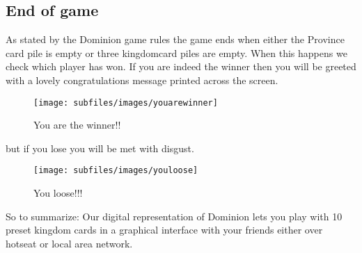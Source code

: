\subsection{End of game}
As stated by the Dominion game rules the game ends when either the Province card pile is empty or three kingdomcard piles are empty. When this happens we check which player has won. If you are indeed the winner then you will be greeted with a lovely congratulations message printed across the screen.
\begin{figure}[h!]
\centering
\texttt{[image: subfiles/images/youarewinner]}
\caption{You are the winner!!}
\end{figure}
but if you lose you will be met with disgust.
\begin{figure}[h!]
\centering
\texttt{[image: subfiles/images/youloose]}
\caption{You loose!!!}
\end{figure}
So to summarize: Our digital representation of Dominion lets you play with 10 preset kingdom cards in a graphical interface with your friends either over hotseat or local area network.
 